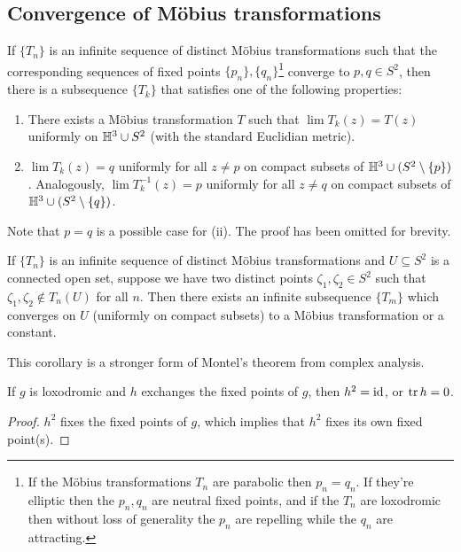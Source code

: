 \subsection{Convergence of M\"obius transformations}
\begin{lemma}\label{seq} 
    If $\{T_n \} $ is an infinite sequence of distinct M\"obius transformations such that the corresponding sequences of fixed points $\{p_n \} ,\{q_n \} $\footnote{If the M\"obius transformations $T_n $ are parabolic then $p_n =q_n $. If they're elliptic then the $p_n ,q_n $ are neutral fixed points, and if the $T_n $ are loxodromic then without loss of generality the $p_n $ are repelling while the $q_n $ are attracting.} converge to $p,q \in S^2$, then there is a subsequence $\{T_k\} $ that satisfies one of the following properties:
    \begin{enumerate}[label=(\roman*)]
\item There exists a M\"obius transformation $T$ such that $\lim T_k(z)=T(z)$ uniformly on $\mathbb{H}^3 \cup S^2$ (with the standard Euclidian metric).
\item $\lim T_k(z)=q$ uniformly for all $z\neq p$ on compact subsets of $\mathbb{H}^3 \cup (S^2 \setminus \{p\} )$. Analogously, $\lim T_k ^{-1}(z)=p$ uniformly for all $z\neq q$ on compact subsets of $\mathbb{H}^3 \cup  (S^2 \setminus \{q\} )$.
    \end{enumerate}
\end{lemma}
Note that $p=q$ is a possible case for (ii). The proof has been omitted for brevity.
\begin{cor}
    If $\{T_n \} $ is an infinite sequence of distinct M\"obius transformations and $U \subseteq S^2$ is a connected open set, suppose we have two distinct points $\zeta_1,\zeta_2 \in S ^2$ such that $\zeta_1,\zeta_2 \notin T_n (U)$ for all $n$. Then there exists an infinite subsequence $\{T_m\} $ which converges on $U $ (uniformly on compact subsets) to a M\"obius transformation or a constant.
\end{cor}
This corollary is a stronger form of Montel's theorem from complex analysis.
\begin{lemma}
    If $g$ is loxodromic and $h$ exchanges the fixed points of $g$, then $h^2=\operatorname{id}$, or $\operatorname{tr} h=0$.
\end{lemma}
\begin{proof}
    $h^2$ fixes the fixed points of $g$, which implies that $h^2$ fixes its own fixed point(s).
\end{proof}

